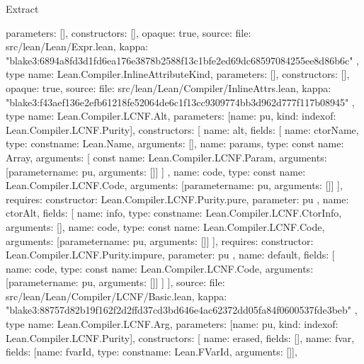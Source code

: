 \begin{lexlean}{Extract}
\begin{toolingmodule}
{{      parameters: [],
      constructors: [],
      opaque: true,
      source: {
        file: src/lean/Lean/Expr.lean,
        kappa: "blake3:6894a8fd3d1fd6ea176e3878b2588f13c1bfe2ed69dc68597084255ee8d86b6c"
      }
    },
    type{
      name: Lean.Compiler.InlineAttributeKind,
      parameters: [],
      constructors: [],
      opaque: true,
      source: {
        file: src/lean/Lean/Compiler/InlineAttrs.lean,
        kappa: "blake3:f43aef136e2efb61218fe52064de6c1f13cc9309774bb3d962d777f117b08945"
      }
    },
    type{
      name: Lean.Compiler.LCNF.Alt,
      parameters: [{name: pu, kind: index{of: Lean.Compiler.LCNF.Purity}}],
      constructors: [
        {
          name: alt,
          fields: [
            {name: ctorName, type: const{name: Lean.Name, arguments: []}},
            {
              name: params,
              type: const{
                name: Array,
                arguments: [
                  const{
                    name: Lean.Compiler.LCNF.Param,
                    arguments: [parameter{name: pu, arguments: []}]
                  }
                ]
              }
            },
            {
              name: code,
              type: const{
                name: Lean.Compiler.LCNF.Code,
                arguments: [parameter{name: pu, arguments: []}]
              }
            }
          ],
          requires: {constructor: Lean.Compiler.LCNF.Purity.pure, parameter: pu}
        },
        {
          name: ctorAlt,
          fields: [
            {name: info, type: const{name: Lean.Compiler.LCNF.CtorInfo, arguments: []}},
            {
              name: code,
              type: const{
                name: Lean.Compiler.LCNF.Code,
                arguments: [parameter{name: pu, arguments: []}]
              }
            }
          ],
          requires: {constructor: Lean.Compiler.LCNF.Purity.impure, parameter: pu}
        },
        {
          name: default,
          fields: [
            {
              name: code,
              type: const{
                name: Lean.Compiler.LCNF.Code,
                arguments: [parameter{name: pu, arguments: []}]
              }
            }
          ]
        }
      ],
      source: {
        file: src/lean/Lean/Compiler/LCNF/Basic.lean,
        kappa: "blake3:88757d82b19f162f2d2ffd37cd3bd646e4ac62372dd05fa84f0600537fde3beb"
      }
    },
    type{
      name: Lean.Compiler.LCNF.Arg,
      parameters: [{name: pu, kind: index{of: Lean.Compiler.LCNF.Purity}}],
      constructors: [
        {name: erased, fields: []},
        {name: fvar, fields: [{name: fvarId, type: const{name: Lean.FVarId, arguments: []}}]},
}}
\end{toolingmodule}
\end{lexlean}
